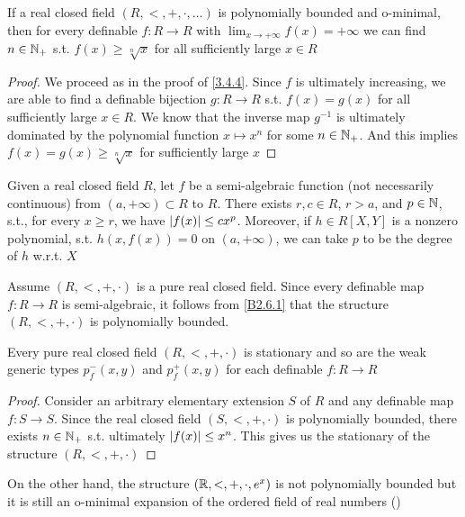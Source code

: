 \documentclass[11pt]{article}
\begin{document}
\begin{remark}
\label{3.5.2}
If a real closed field \((R,<,+,\cdot,\dots)\) is polynomially bounded and o-minimal, then for every
definable \(f:R\to R\) with \(\lim_{x\to+\infty}f(x)=+\infty\) we can find \(n\in\mathbb{N}_+\) s.t. \(f(x)\ge\sqrt[n]{x}\)
for all sufficiently large \(x\in R\)
\end{remark}

\begin{proof}
We proceed as in the proof of \ref{3.4.4}. Since \(f\) is ultimately increasing, we are able to
find a definable bijection \(g:R\to R\) s.t. \(f(x)=g(x)\) for all sufficiently large \(x\in R\). We
know that the inverse map \(g^{-1}\) is ultimately dominated by the polynomial
function \(x\mapsto x^n\) for some \(n\in\mathbb{N}_+\). And this implies \(f(x)=g(x)\ge\sqrt[n]{x}\) for
sufficiently large \(x\)
\end{proof}

\begin{proposition}
\label{B2.6.1}
Given a real closed field \(R\), let \(f\) be a semi-algebraic function (not necessarily
continuous) from \((a,+\infty)\subset R\) to \(R\). There exists \(r,c\in R\), \(r>a\), and \(p\in\mathbb{N}\), s.t.,
for every \(x\ge r\), we have \(\abs{f(x)}\le cx^p\). Moreover, if \(h\in R[X,Y]\) is a nonzero
polynomial, s.t. \(h(x,f(x))=0\) on \((a,+\infty)\), we can take \(p\) to be the degree of \(h\) w.r.t. \(X\)
\end{proposition}


Assume \((R,<,+,\cdot)\) is a pure real closed field. Since every definable map \(f:R\to R\) is
semi-algebraic, it follows from \ref{B2.6.1} that the
structure \((R,<,+,\cdot)\) is polynomially bounded.

\begin{corollary}[]
Every pure real closed field \((R,<,+,\cdot)\) is stationary and so are the weak generic
types \(p_f^-(x,y)\) and \(p_f^+(x,y)\) for each definable \(f:R\to R\)
\end{corollary}

\begin{proof}
Consider an arbitrary elementary extension \(S\) of \(R\) and any definable map \(f:S\to S\).
Since the real closed field \((S,<,+,\cdot)\) is polynomially bounded, there exists \(n\in\mathbb{N}_+\) s.t.
ultimately \(\abs{f(x)}\le x^n\). This gives us the stationary of the structure \((R,<,+,\cdot)\)
\end{proof}

On the other hand, the structure \((\mathbb{R},<,+,\cdot,e^x)\) is not polynomially bounded but it is still an
o-minimal expansion of the ordered field of real numbers (\cite{Wilkie1996ModelCR})
\end{document}
